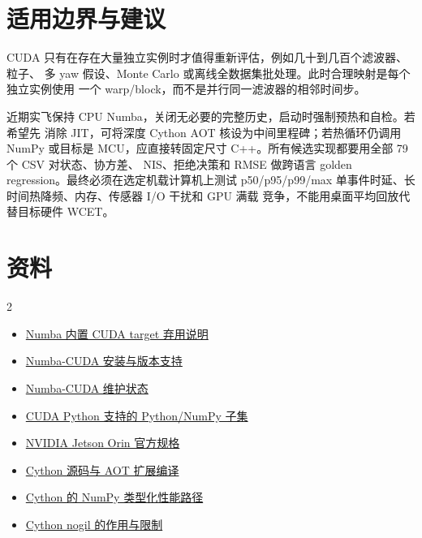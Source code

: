 \documentclass[11pt,a4paper]{ctexart}
\begin{document}
\section{适用边界与建议}

CUDA 只有在存在大量独立实例时才值得重新评估，例如几十到几百个滤波器、粒子、
多 yaw 假设、Monte Carlo 或离线全数据集批处理。此时合理映射是每个独立实例使用
一个 warp/block，而不是并行同一滤波器的相邻时间步。

近期实飞保持 CPU Numba，关闭无必要的完整历史，启动时强制预热和自检。若希望先
消除 JIT，可将深度 Cython AOT 核设为中间里程碑；若热循环仍调用 NumPy 或目标是
MCU，应直接转固定尺寸 C++。所有候选实现都要用全部 79 个 CSV 对状态、协方差、
NIS、拒绝决策和 RMSE 做跨语言 golden regression。最终必须在选定机载计算机上测试
p50/p95/p99/max 单事件时延、长时间热降频、内存、传感器 I/O 干扰和 GPU 满载
竞争，不能用桌面平均回放代替目标硬件 WCET。

\section{资料}

\begin{multicols}{2}
\small
\begin{itemize}
\setlength{\itemsep}{0.15em}
 \item \href{https://numba.readthedocs.io/en/0.61.0rc1/reference/deprecation.html}
 {Numba 内置 CUDA target 弃用说明}
 \item \href{https://nvidia.github.io/numba-cuda/user/installation.html}
 {Numba-CUDA 安装与版本支持}
 \item \href{https://nvidia.github.io/numba-cuda/}
 {Numba-CUDA 维护状态}
 \item \href{https://nvidia.github.io/numba-cuda/user/cudapysupported.html}
 {CUDA Python 支持的 Python/NumPy 子集}
 \item \href{https://www.nvidia.com/en-eu/autonomous-machines/embedded-systems/jetson-orin/}
 {NVIDIA Jetson Orin 官方规格}
 \item \href{https://cython.readthedocs.io/en/stable/src/userguide/source_files_and_compilation.html}
 {Cython 源码与 AOT 扩展编译}
 \item \href{https://cython.readthedocs.io/en/latest/src/userguide/numpy_tutorial.html}
 {Cython 的 NumPy 类型化性能路径}
 \item \href{https://cython.readthedocs.io/en/latest/src/userguide/nogil.html}
 {Cython nogil 的作用与限制}
\end{itemize}
\end{multicols}
\end{document}
